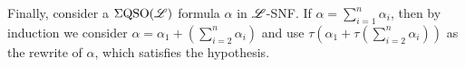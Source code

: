 Finally, consider a $\Sigma{\rm QSO}(\mathscr{L})$ formula $\alpha$ in $\mathscr{L}$-SNF. If $\alpha = \sum_{i = 1}^n\alpha_i$, then by induction we consider $\alpha = \alpha_1 + (\sum_{i = 2}^n\alpha_i)$ and use $\tau(\alpha_1 + \tau(\sum_{i = 2}^n\alpha_i))$ as the rewrite of $\alpha$, which satisfies the hypothesis.
